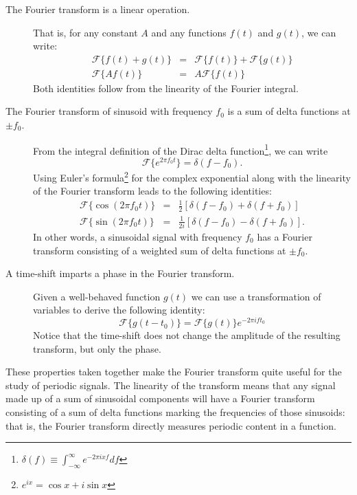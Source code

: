 \documentclass[preprint]{aastex}
\newcommand{\eqlabel}[1]{\label{eq:#1}}
\begin{document}
\begin{description}
   \item[The Fourier transform is a linear operation.]
     That is, for any constant $A$ and any functions $f(t)$ and $g(t)$,
     we can write:
     \begin{eqnarray}
       \mathcal{F}\{f(t) + g(t)\} &=& \mathcal{F}\{f(t)\} + \mathcal{F}\{g(t)\}\nonumber\\
       \mathcal{F}\{A f(t)\} &=& A\mathcal{F}\{f(t)\}
     \end{eqnarray}
     Both identities follow from the linearity of the Fourier integral.

   \item[The Fourier transform of sinusoid with frequency $f_0$ is a sum of delta functions at $\pm f_0$.]
     From the integral definition of the Dirac delta function\footnote{
       $\delta(f)\equiv\int_{-\infty}^\infty e^{-2\pi i x f}df$},
     we can write
     \begin{equation}
       \mathcal{F}\{e^{2\pi f_0 t}\} = \delta(f - f_0).
       \eqlabel{delta-FT}
     \end{equation}
     Using Euler's formula\footnote{$e^{ix} = \cos x + i\sin x$}
     for the complex exponential along with the linearity
     of the Fourier transform leads to the following identities:
     \begin{eqnarray}
       \mathcal{F}\{\cos(2\pi f_0 t)\} &=& \frac{1}{2}\left[\delta(f - f_0) + \delta(f + f_0)\right]\nonumber\\
       \mathcal{F}\{\sin(2\pi f_0 t)\} &=& \frac{1}{2i}\left[\delta(f - f_0) - \delta(f + f_0)\right].
     \end{eqnarray}
     In other words, a sinusoidal signal with frequency $f_0$ has a Fourier
     transform consisting of a weighted sum of delta functions at $\pm f_0$.

   \item[A time-shift imparts a phase in the Fourier transform.]
     Given a well-behaved function $g(t)$ we can use a transformation of
     variables to derive the following identity:
     \begin{equation}
       \mathcal{F}\{g(t - t_0)\} = \mathcal{F}\{g(t)\} e^{-2\pi i ft_0}
     \end{equation}
     Notice that the time-shift does not change the
     amplitude of the resulting transform, but only the phase.
\end{description}
These properties taken together make the Fourier transform quite useful for the study of periodic signals.
The linearity of the transform means that any signal made up of a sum of
sinusoidal components will have a Fourier transform consisting of a sum
of delta functions marking the frequencies of those sinusoids: that is,
the Fourier transform directly measures periodic content in a function.
\end{document}
